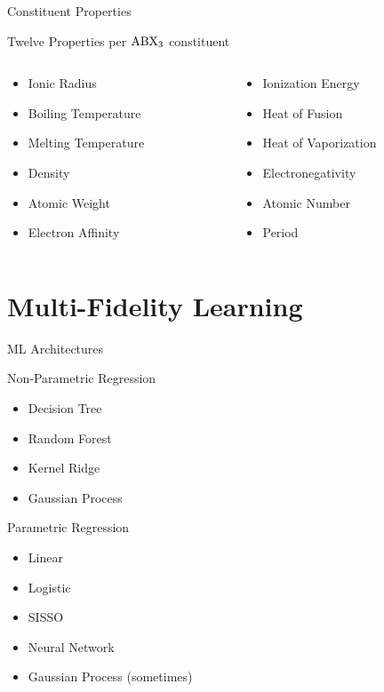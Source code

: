 \documentclass[10pt, aspectratio=169, presentation]{beamer}
\begin{document}
\begin{frame}[label={sec:orgfa9408f}]{Constituent Properties}
\begin{block}{Twelve Properties per \(\ce{ABX_3}\) constituent}
\begin{columns}
\begin{column}{0.5\columnwidth}
\begin{itemize}
\item Ionic Radius
\item Boiling Temperature
\item Melting Temperature
\item Density
\item Atomic Weight
\item Electron Affinity
\end{itemize}
\end{column}
\begin{column}{0.5\columnwidth}
\begin{itemize}
\item Ionization Energy
\item Heat of Fusion
\item Heat of Vaporization
\item Electronegativity
\item Atomic Number
\item Period
\end{itemize}
\end{column}
\end{columns}
\end{block}
\end{frame}

\section{Multi-Fidelity Learning}
\label{sec:orgdd5df3c}
\begin{frame}[label={sec:org34eb9c2}]{ML Architectures}
\begin{block}{Non-Parametric Regression}
\begin{itemize}
\item Decision Tree
\item Random Forest
\item Kernel Ridge
\item Gaussian Process
\end{itemize}
\end{block}
\begin{block}{Parametric Regression}
\begin{itemize}
\item Linear
\item Logistic
\item SISSO
\item Neural Network
\item Gaussian Process (sometimes)
\end{itemize}
\end{block}
\end{frame}
\end{document}
